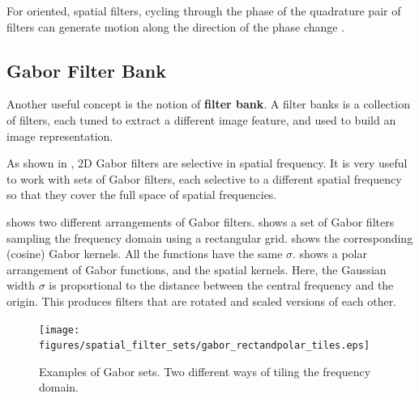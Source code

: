 For oriented, spatial filters, cycling through the phase of the
quadrature pair of filters can generate motion along the direction of
the phase change \cite{Freeman91b}.  %






\subsection{Gabor Filter Bank}

Another useful concept is the notion of {\bf filter bank}. 
A filter banks is a collection of filters, each tuned to extract a different image feature, and used to build an image representation. 


As shown in \fig{\ref{fig:gabor_ft}}, 2D Gabor filters are selective in spatial frequency. It is very useful to work with sets of Gabor filters, each selective to a different spatial frequency so that they cover the full space of spatial frequencies.

\Fig{\ref{fig:gabor_rectandpolar_tiles}} shows two different arrangements of Gabor filters.  shows a set of Gabor filters sampling the frequency domain using a rectangular grid.  shows the corresponding (cosine) Gabor kernels. All the functions have the same $\sigma$.  shows a polar arrangement of Gabor functions, and  the spatial kernels. Here, the Gaussian width $\sigma$ is proportional to the distance between the central frequency and the origin. This produces filters that are rotated and scaled versions of each other.

\begin{figure}[t]
\centerline{
\texttt{[image: figures/spatial\_filter\_sets/gabor\_rectandpolar\_tiles.eps]} }
\caption{Examples of Gabor sets. Two different ways of tiling the frequency domain.} 
\label{fig:gabor_rectandpolar_tiles}
\end{figure}

